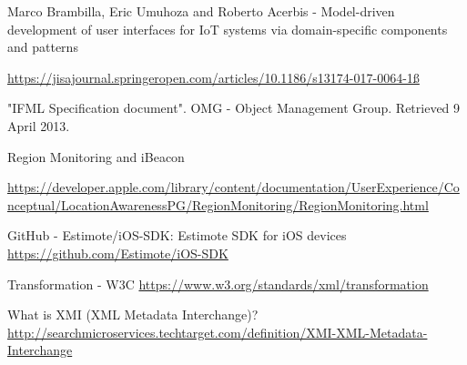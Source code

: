 

\begin{thebibliography}{90}

Marco Brambilla, Eric Umuhoza and Roberto Acerbis - Model-driven development of user interfaces for IoT systems via domain-specific components and patterns

\url{https://jisajournal.springeropen.com/articles/10.1186/s13174-017-0064-1ß}
    
"IFML Specification document". OMG - Object Management Group. Retrieved 9 April 2013.

Region Monitoring and iBeacon

\url{https://developer.apple.com/library/content/documentation/UserExperience/Conceptual/LocationAwarenessPG/RegionMonitoring/RegionMonitoring.html}
    
GitHub - Estimote/iOS-SDK: Estimote SDK for iOS devices
\url{https://github.com/Estimote/iOS-SDK}

Transformation - W3C
\url{https://www.w3.org/standards/xml/transformation}

What is XMI (XML Metadata Interchange)?
\url{http://searchmicroservices.techtarget.com/definition/XMI-XML-Metadata-Interchange}

\end{thebibliography}


